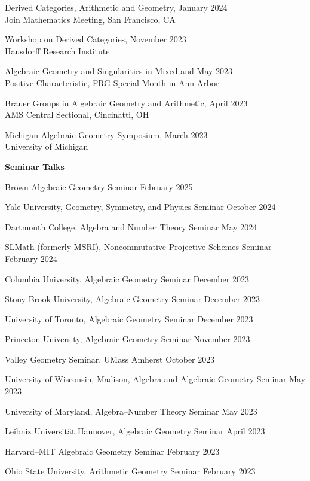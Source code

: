 \documentclass[11 pt]{letter}
\begin{document}
	Derived Categories, Arithmetic and Geometry, \hfill January 2024 \\
	\indent Join Mathematics Meeting, San Francisco, CA
	
	Workshop on Derived Categories, \hfill November 2023 \\
	\indent Hausdorff Research Institute 

	Algebraic Geometry and Singularities in Mixed and \hfill May 2023 \\
	\indent Positive Characteristic, FRG Special Month in Ann Arbor 


	Brauer Groups in Algebraic Geometry and Arithmetic, \hfill April 2023 \\
	\indent AMS Central Sectional, Cincinatti, OH


	Michigan Algebraic Geometry Symposium, \hfill March 2023 \\
	\indent University of Michigan


	\medskip
	\noindent
	\textbf{\large{Seminar Talks}}

	Brown Algebraic Geometry Seminar \hfill February 2025

	Yale University, Geometry, Symmetry, and Physics Seminar \hfill October 2024 

	Dartmouth College, Algebra and Number Theory Seminar \hfill May 2024

	SLMath (formerly MSRI), Noncommutative Projective Schemes Seminar \hfill February 2024

	Columbia University, Algebraic Geometry Seminar \hfill December 2023

	Stony Brook University, Algebraic Geometry Seminar \hfill December 2023

	University of Toronto, Algebraic Geometry Seminar \hfill December 2023

	Princeton University, Algebraic Geometry Seminar \hfill November 2023

	Valley Geometry Seminar, UMass Amherst \hfill October 2023

	University of Wisconsin, Madison, Algebra and Algebraic Geometry Seminar \hfill May 2023

	University of Maryland, Algebra--Number Theory Seminar \hfill May 2023

	Leibniz Universit\"at Hannover, Algebraic Geometry Seminar \hfill April 2023

	Harvard--MIT Algebraic Geometry Seminar \hfill February 2023

	Ohio State University, Arithmetic Geometry Seminar \hfill February 2023
\end{document}
